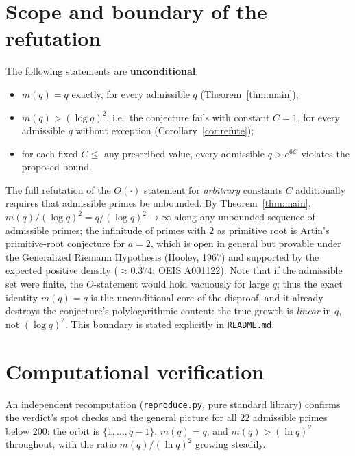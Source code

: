 \documentclass[11pt]{article}
\theoremstyle{definition}
\begin{document}
\section{Scope and boundary of the refutation}
\label{sec:boundary}

The following statements are \textbf{unconditional}:
\begin{itemize}
\item $m(q)=q$ exactly, for every admissible $q$ (Theorem~\ref{thm:main});
\item $m(q) > (\log q)^2$, i.e.\ the conjecture fails with constant $C=1$, for
      every admissible $q$ without exception (Corollary~\ref{cor:refute});
\item for each fixed $C \le $ any prescribed value, every admissible
      $q > e^{6C}$ violates the proposed bound.
\end{itemize}

The full refutation of the $O(\cdot)$ statement for \emph{arbitrary} constants
$C$ additionally requires that admissible primes be unbounded.  By
Theorem~\ref{thm:main}, $m(q)/(\log q)^2 = q/(\log q)^2 \to \infty$ along any
unbounded sequence of admissible primes; the infinitude of primes with $2$ as
primitive root is Artin's primitive-root conjecture for $a=2$, which is open in
general but provable under the Generalized Riemann Hypothesis
(Hooley, 1967) and supported by the expected positive density
($\approx 0.374$; OEIS A001122).  Note that if the admissible set were finite,
the $O$-statement would hold vacuously for large $q$; thus the exact identity
$m(q)=q$ is the unconditional core of the disproof, and it already destroys
the conjecture's polylogarithmic content: the true growth is \emph{linear} in
$q$, not $(\log q)^2$.  This boundary is stated explicitly in
\texttt{README.md}.

\section{Computational verification}

An independent recomputation (\texttt{reproduce.py}, pure standard library)
confirms the verdict's spot checks and the general picture for all $22$
admissible primes below $200$: the orbit is $\{1,\dots,q-1\}$, $m(q)=q$, and
$m(q) > (\ln q)^2$ throughout, with the ratio $m(q)/(\ln q)^2$ growing
steadily.
\end{document}
